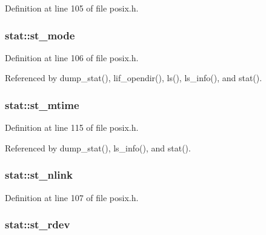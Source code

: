 Definition at line 105 of file posix.\+h.

\subsubsection[{\texorpdfstring{st\+\_\+mode}{st_mode}}]{ stat\+::st\+\_\+mode}\hypertarget{structstat_a5cbdd829011af82ba61e83773bbcbc7d}{}\label{structstat_a5cbdd829011af82ba61e83773bbcbc7d}


Definition at line 106 of file posix.\+h.



Referenced by dump\+\_\+stat(), lif\+\_\+opendir(), ls(), ls\+\_\+info(), and stat().

\subsubsection[{\texorpdfstring{st\+\_\+mtime}{st_mtime}}]{ stat\+::st\+\_\+mtime}\hypertarget{structstat_a77e235090f8cb6897f1c0ce65689006b}{}\label{structstat_a77e235090f8cb6897f1c0ce65689006b}


Definition at line 115 of file posix.\+h.



Referenced by dump\+\_\+stat(), ls\+\_\+info(), and stat().

\subsubsection[{\texorpdfstring{st\+\_\+nlink}{st_nlink}}]{ stat\+::st\+\_\+nlink}\hypertarget{structstat_a0ed9092fa6c77a3251b9b9a4738ef84f}{}\label{structstat_a0ed9092fa6c77a3251b9b9a4738ef84f}


Definition at line 107 of file posix.\+h.

\subsubsection[{\texorpdfstring{st\+\_\+rdev}{st_rdev}}]{ stat\+::st\+\_\+rdev}\hypertarget{structstat_aa61e6c1a8a91c69f1d26f6700a0546cb}{}\label{structstat_aa61e6c1a8a91c69f1d26f6700a0546cb}


